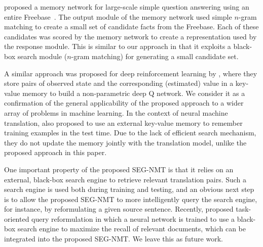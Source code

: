 
 proposed a memory network for large-scale simple question answering using an entire Freebase~\citep{bollacker2008freebase}. The output module of the memory network used simple $n$-gram matching to create a small set of candidate facts from the Freebase. Each of these candidates was scored by the memory network to create a representation used by the response module. This is similar to our approach in that it exploits a black-box search module ($n$-gram matching) for generating a small candidate set. 


A similar approach was proposed for deep reinforcement learning by , where they store pairs of observed state and the corresponding (estimated) value in a key-value memory to build a non-parametric deep Q network. We consider it as a confirmation of the general applicability of the proposed approach to a wider array of problems in machine learning.
In the context of neural machine translation,  also proposed to use an external key-value memory to remember training examples in the test time. Due to the lack of efficient search mechanism, they do not update the memory jointly with the translation model, unlike the proposed approach in this paper.

One important property of the proposed SEG-NMT is that it relies on an external, black-box search engine to retrieve relevant translation pairs. Such a search engine is used both during training and testing, and an obvious next step is to allow the proposed SEG-NMT to more intelligently query the search engine, for instance, by reformulating a given source sentence. Recently,  proposed task-oriented query reformulation in which a neural network is trained to use a black-box search engine to maximize the recall of relevant documents, which can be integrated into the proposed SEG-NMT. We leave this as future work.

